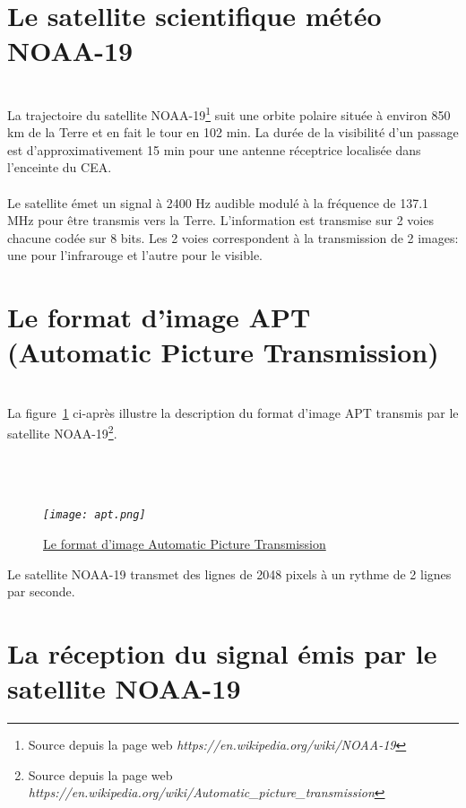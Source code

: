 \documentclass[12pt,fleqn]{book} %
\begin{document}
\section{Le satellite scientifique météo NOAA-19}
~\\\indent La trajectoire du satellite NOAA-19\footnote{Source depuis la page web \emph{https://en.wikipedia.org/wiki/NOAA-19}} suit une orbite polaire située à environ 850 km de la Terre et en fait le tour en 102 min. La durée de la visibilité d'un passage est d'approximativement 15 min pour une antenne réceptrice localisée dans l'enceinte du CEA.
~\\\\Le satellite émet un signal à 2400 Hz audible modulé à la fréquence de 137.1 MHz pour être transmis vers la Terre. L'information est transmise sur 2 voies chacune codée sur 8 bits. Les 2 voies correspondent à la transmission de 2 images: une pour l'infrarouge et l'autre pour le visible.
\section{Le format d'image APT (Automatic Picture Transmission)}
~\\\indent La figure~\ref{apt} ci-après illustre la description du format d'image APT transmis par le satellite NOAA-19\footnote{Source depuis la page web \emph{https://en.wikipedia.org/wiki/Automatic\_picture\_transmission}}.
~\\\\
~\\\\
\begin{figure}[H]
	\centering
	\itshape
	\texttt{[image: apt.png]}
	\caption{\label{apt} \underline{Le format d'image Automatic Picture Transmission}}
\end{figure}
Le satellite NOAA-19 transmet des lignes de 2048 pixels à un rythme de 2 lignes par seconde.
\section{La réception du signal émis par le satellite NOAA-19}
\end{document}
